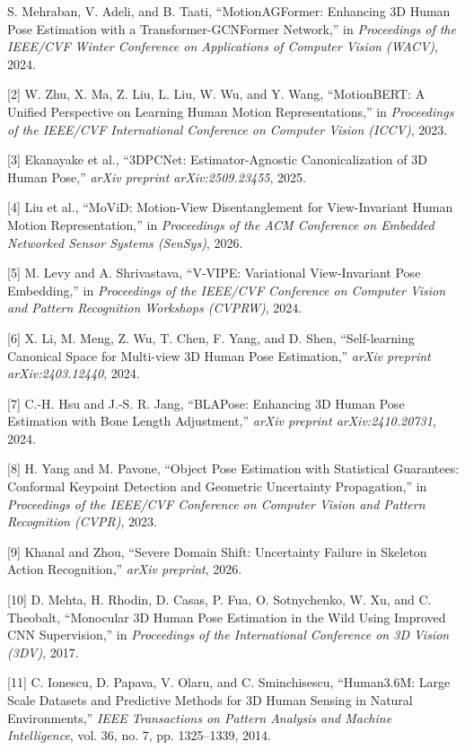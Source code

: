 \documentclass[12pt,a4paper]{report}
\begin{document}
\singlespacing
{\fontsize{12}{15}\selectfont
[1] S. Mehraban, V. Adeli, and B. Taati, ``MotionAGFormer: Enhancing 3D Human Pose Estimation with a Transformer-GCNFormer Network,'' in \textit{Proceedings of the IEEE/CVF Winter Conference on Applications of Computer Vision (WACV)}, 2024.

[2] W. Zhu, X. Ma, Z. Liu, L. Liu, W. Wu, and Y. Wang, ``MotionBERT: A Unified Perspective on Learning Human Motion Representations,'' in \textit{Proceedings of the IEEE/CVF International Conference on Computer Vision (ICCV)}, 2023.

[3] Ekanayake et al., ``3DPCNet: Estimator-Agnostic Canonicalization of 3D Human Pose,'' \textit{arXiv preprint arXiv:2509.23455}, 2025.

[4] Liu et al., ``MoViD: Motion-View Disentanglement for View-Invariant Human Motion Representation,'' in \textit{Proceedings of the ACM Conference on Embedded Networked Sensor Systems (SenSys)}, 2026.

[5] M. Levy and A. Shrivastava, ``V-VIPE: Variational View-Invariant Pose Embedding,'' in \textit{Proceedings of the IEEE/CVF Conference on Computer Vision and Pattern Recognition Workshops (CVPRW)}, 2024.

[6] X. Li, M. Meng, Z. Wu, T. Chen, F. Yang, and D. Shen, ``Self-learning Canonical Space for Multi-view 3D Human Pose Estimation,'' \textit{arXiv preprint arXiv:2403.12440}, 2024.

[7] C.-H. Hsu and J.-S. R. Jang, ``BLAPose: Enhancing 3D Human Pose Estimation with Bone Length Adjustment,'' \textit{arXiv preprint arXiv:2410.20731}, 2024.

[8] H. Yang and M. Pavone, ``Object Pose Estimation with Statistical Guarantees: Conformal Keypoint Detection and Geometric Uncertainty Propagation,'' in \textit{Proceedings of the IEEE/CVF Conference on Computer Vision and Pattern Recognition (CVPR)}, 2023.

[9] Khanal and Zhou, ``Severe Domain Shift: Uncertainty Failure in Skeleton Action Recognition,'' \textit{arXiv preprint}, 2026.

[10] D. Mehta, H. Rhodin, D. Casas, P. Fua, O. Sotnychenko, W. Xu, and C. Theobalt, ``Monocular 3D Human Pose Estimation in the Wild Using Improved CNN Supervision,'' in \textit{Proceedings of the International Conference on 3D Vision (3DV)}, 2017.

[11] C. Ionescu, D. Papava, V. Olaru, and C. Sminchisescu, ``Human3.6M: Large Scale Datasets and Predictive Methods for 3D Human Sensing in Natural Environments,'' \textit{IEEE Transactions on Pattern Analysis and Machine Intelligence}, vol. 36, no. 7, pp. 1325--1339, 2014.

}
\end{document}
